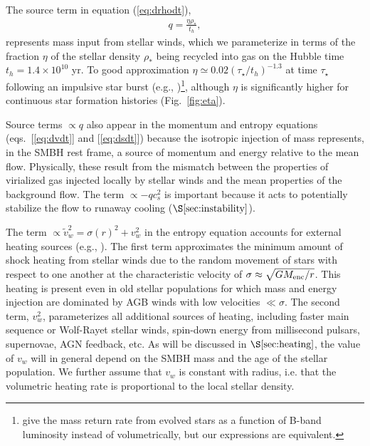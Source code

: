 \documentclass[usenatbib,fleqn]{mn2e}
\newcommand{\vw}{\tilde{v}_{w}}
\newcommand{\rhostar}{\rho_*}
\renewcommand{\th}{t_h}
\begin{document}
The source term in equation (\ref{eq:drhodt}),
\begin{align}
  q=\frac{\eta \rhostar}{\th},
\label{eq:q}
\end{align}
represents mass input from stellar winds, which we parameterize in
terms of the fraction $\eta$ of the stellar density $\rhostar$ being
recycled into gas on the Hubble time $\th = 1.4 \times 10^{10}$
yr.  To good approximation $\eta\simeq 0.02 (\tau_{\star}/t_h)^{-1.3}$ at time $\tau_{\star}$ following an impulsive star burst (e.g., \citealt{Ciotti+91})\footnote{\citet{Ciotti+91} give the mass return rate from evolved stars as a function of B-band luminosity instead of volumetrically, but our expressions are equivalent.}, although $\eta$ is significantly higher for continuous star formation histories (Fig.~\ref{fig:eta}).  

Source terms $\propto q$ also appear in the momentum and entropy
equations (eqs.~[\ref{eq:dvdt}] and [\ref{eq:dsdt}]) because the isotropic injection of mass represents, in the SMBH rest frame, a source of momentum
and energy relative to the mean flow.  Physically, these result from
the mismatch between the properties of virialized gas injected locally
by stellar winds and the mean properties of the background flow.  The
term $\propto -q c_{s}^{2}$ is important because it acts to potentially stabilize the flow to runaway cooling ($\S\ref{sec:instability}$).

The term $\propto \vw^2 = \sigma(r)^2+v_{w}^2$ in the entropy
equation accounts for external heating sources (e.g.,
\citealt{ShcherbakovWong+:2014a}).  The first term approximates the
minimum amount of shock heating from stellar winds due to the random movement
of stars with respect to one another at the characteristic velocity of $\sigma \approx \sqrt{GM_{\rm enc}/r}$.  This heating is present even in old stellar populations for which mass and energy injection are dominated by AGB winds with low velocities $\ll \sigma$.  The second term, $v_{w}^{2}$, parameterizes all additional sources of heating, including faster main
sequence or Wolf-Rayet stellar winds, spin-down energy from millisecond pulsars, supernovae, AGN
feedback, etc.  As will be discussed in $\S\ref{sec:heating}$, the value of
$v_{w}$ will in general depend on the SMBH mass and
the age of the stellar population.  We further assume that $v_w$ is constant with radius, i.e. that the volumetric heating rate is proportional to the local stellar density.
\end{document}
